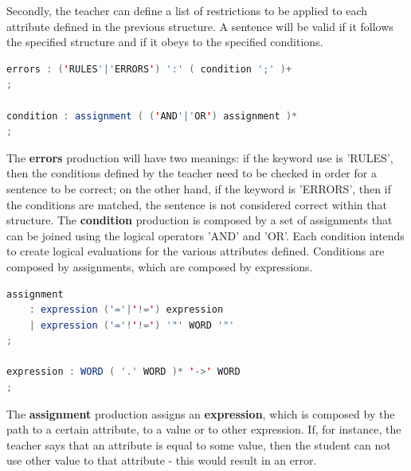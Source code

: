 Secondly, the teacher can define a list of restrictions to be applied to each attribute defined in the previous structure. A sentence will be valid if it follows the specified structure and if it obeys to the specified conditions.

\begin{center}
\begin{minipage}{12cm}
\begin{lstlisting}[language=java, basicstyle=\small, label={lst:dsl_errors_prod}, caption=DSL errors/expression productions]
errors : ('RULES'|'ERRORS') ':' ( condition ';' )+
;

condition : assignment ( ('AND'|'OR') assignment )*
;
\end{lstlisting}
\end{minipage}
\end{center}

The \textbf{errors} production will have two meanings: if the keyword use is 'RULES', then the conditions defined by the teacher need to be checked in order for a sentence to be correct; on the other hand, if the keyword is 'ERRORS', then if the conditions are matched, the sentence is not considered correct within that structure.
The \textbf{condition} production is composed by a set of assignments that can be joined using the logical operators 'AND' and 'OR'. 
Each condition intends to create logical evaluations for the various attributes defined.
Conditions are composed by assignments, which are composed by expressions.

\begin{center}
\begin{minipage}{10cm}
\begin{lstlisting}[language=java, basicstyle=\small, label={lst:dsl_cond_prod}, caption=DSL condition production]
assignment 
    : expression ('='|'!=') expression
    | expression ('='!'!=') '"' WORD '"'
;

expression : WORD ( '.' WORD )* '->' WORD 
;
\end{lstlisting}
\end{minipage}
\end{center}

The \textbf{assignment} production assigns an \textbf{expression}, which is composed by the path to a certain attribute, to a value or to other expression. 
If, for instance, the teacher says that an attribute is equal to some value, then the student can not use other value to that attribute - this would result in an error.

